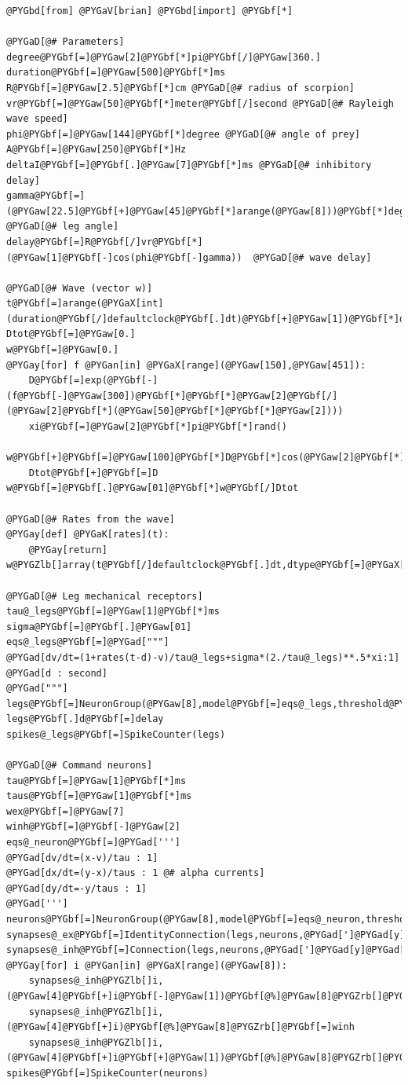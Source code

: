 \documentclass[letterpaper,10pt,english]{manual}
\begin{document}
\begin{Verbatim}[commandchars=@\[\]]
@PYGbd[from] @PYGaV[brian] @PYGbd[import] @PYGbf[*]

@PYGaD[@# Parameters]
degree@PYGbf[=]@PYGaw[2]@PYGbf[*]pi@PYGbf[/]@PYGaw[360.]
duration@PYGbf[=]@PYGaw[500]@PYGbf[*]ms
R@PYGbf[=]@PYGaw[2.5]@PYGbf[*]cm @PYGaD[@# radius of scorpion]
vr@PYGbf[=]@PYGaw[50]@PYGbf[*]meter@PYGbf[/]second @PYGaD[@# Rayleigh wave speed]
phi@PYGbf[=]@PYGaw[144]@PYGbf[*]degree @PYGaD[@# angle of prey]
A@PYGbf[=]@PYGaw[250]@PYGbf[*]Hz
deltaI@PYGbf[=]@PYGbf[.]@PYGaw[7]@PYGbf[*]ms @PYGaD[@# inhibitory delay]
gamma@PYGbf[=](@PYGaw[22.5]@PYGbf[+]@PYGaw[45]@PYGbf[*]arange(@PYGaw[8]))@PYGbf[*]degree @PYGaD[@# leg angle]
delay@PYGbf[=]R@PYGbf[/]vr@PYGbf[*](@PYGaw[1]@PYGbf[-]cos(phi@PYGbf[-]gamma))  @PYGaD[@# wave delay]

@PYGaD[@# Wave (vector w)]
t@PYGbf[=]arange(@PYGaX[int](duration@PYGbf[/]defaultclock@PYGbf[.]dt)@PYGbf[+]@PYGaw[1])@PYGbf[*]defaultclock@PYGbf[.]dt
Dtot@PYGbf[=]@PYGaw[0.]
w@PYGbf[=]@PYGaw[0.]
@PYGay[for] f @PYGan[in] @PYGaX[range](@PYGaw[150],@PYGaw[451]):
    D@PYGbf[=]exp(@PYGbf[-](f@PYGbf[-]@PYGaw[300])@PYGbf[*]@PYGbf[*]@PYGaw[2]@PYGbf[/](@PYGaw[2]@PYGbf[*](@PYGaw[50]@PYGbf[*]@PYGbf[*]@PYGaw[2])))
    xi@PYGbf[=]@PYGaw[2]@PYGbf[*]pi@PYGbf[*]rand()
    w@PYGbf[+]@PYGbf[=]@PYGaw[100]@PYGbf[*]D@PYGbf[*]cos(@PYGaw[2]@PYGbf[*]pi@PYGbf[*]f@PYGbf[*]t@PYGbf[+]xi)
    Dtot@PYGbf[+]@PYGbf[=]D
w@PYGbf[=]@PYGbf[.]@PYGaw[01]@PYGbf[*]w@PYGbf[/]Dtot

@PYGaD[@# Rates from the wave]
@PYGay[def] @PYGaK[rates](t):
    @PYGay[return] w@PYGZlb[]array(t@PYGbf[/]defaultclock@PYGbf[.]dt,dtype@PYGbf[=]@PYGaX[int])@PYGZrb[]

@PYGaD[@# Leg mechanical receptors]
tau@_legs@PYGbf[=]@PYGaw[1]@PYGbf[*]ms
sigma@PYGbf[=]@PYGbf[.]@PYGaw[01]
eqs@_legs@PYGbf[=]@PYGad["""]
@PYGad[dv/dt=(1+rates(t-d)-v)/tau@_legs+sigma*(2./tau@_legs)**.5*xi:1]
@PYGad[d : second]
@PYGad["""]
legs@PYGbf[=]NeuronGroup(@PYGaw[8],model@PYGbf[=]eqs@_legs,threshold@PYGbf[=]@PYGaw[1],reset@PYGbf[=]@PYGaw[0],refractory@PYGbf[=]@PYGaw[1]@PYGbf[*]ms,check@_units@PYGbf[=]@PYGaA[False])
legs@PYGbf[.]d@PYGbf[=]delay
spikes@_legs@PYGbf[=]SpikeCounter(legs)

@PYGaD[@# Command neurons]
tau@PYGbf[=]@PYGaw[1]@PYGbf[*]ms
taus@PYGbf[=]@PYGaw[1]@PYGbf[*]ms
wex@PYGbf[=]@PYGaw[7]
winh@PYGbf[=]@PYGbf[-]@PYGaw[2]
eqs@_neuron@PYGbf[=]@PYGad[''']
@PYGad[dv/dt=(x-v)/tau : 1]
@PYGad[dx/dt=(y-x)/taus : 1 @# alpha currents]
@PYGad[dy/dt=-y/taus : 1]
@PYGad[''']
neurons@PYGbf[=]NeuronGroup(@PYGaw[8],model@PYGbf[=]eqs@_neuron,threshold@PYGbf[=]@PYGaw[1],reset@PYGbf[=]@PYGaw[0])
synapses@_ex@PYGbf[=]IdentityConnection(legs,neurons,@PYGad[']@PYGad[y]@PYGad['],weight@PYGbf[=]wex)
synapses@_inh@PYGbf[=]Connection(legs,neurons,@PYGad[']@PYGad[y]@PYGad['],delay@PYGbf[=]deltaI)
@PYGay[for] i @PYGan[in] @PYGaX[range](@PYGaw[8]):
    synapses@_inh@PYGZlb[]i,(@PYGaw[4]@PYGbf[+]i@PYGbf[-]@PYGaw[1])@PYGbf[@%]@PYGaw[8]@PYGZrb[]@PYGbf[=]winh
    synapses@_inh@PYGZlb[]i,(@PYGaw[4]@PYGbf[+]i)@PYGbf[@%]@PYGaw[8]@PYGZrb[]@PYGbf[=]winh
    synapses@_inh@PYGZlb[]i,(@PYGaw[4]@PYGbf[+]i@PYGbf[+]@PYGaw[1])@PYGbf[@%]@PYGaw[8]@PYGZrb[]@PYGbf[=]winh
spikes@PYGbf[=]SpikeCounter(neurons)


\end{Verbatim}
\end{document}

